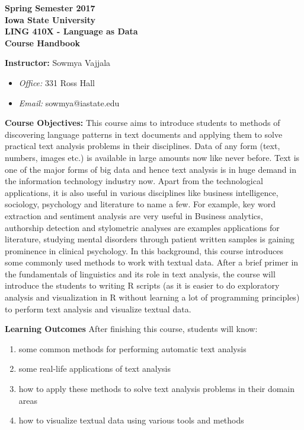 \documentclass[11pt,a4paper]{article}
\begin{document}
\begin{center}
  \textbf{Spring Semester 2017 \\ Iowa State University\\[3ex]
  {\Large LING 410X - Language as Data}\\[3ex]
  Course Handbook
}
\end{center}

\bigskip
\textbf{\large Instructor:}
  Sowmya Vajjala
  \begin{itemize}\vspace*{-.4\baselineskip}\itemsep-.4ex
  \item \textit{Office:} 331 Ross Hall
  \item \textit{Email:} sowmya@iastate.edu
\end{itemize}

\textbf{\large Course Objectives:}
This course aims to introduce students to methods of discovering language patterns in text documents and applying them to solve practical text analysis problems in their disciplines. Data of any form (text, numbers, images etc.) is available in large amounts now like never before. Text is one of the major forms of big data and hence text analysis is in huge demand in the information technology industry now. Apart from the technological applications, it is also useful in various disciplines like business intelligence, sociology, psychology and literature to name a few. For example, key word extraction and sentiment analysis are very useful in Business analytics, authorship detection and stylometric analyses are examples applications for literature, studying mental disorders through patient written samples is gaining prominence in clinical psychology. In this background, this course introduces some commonly used methods to work with textual data. After a brief primer in the fundamentals of linguistics and its role in text analysis, the course will introduce the students to writing  R scripts (as it is easier to do exploratory analysis and visualization in R without learning a lot of programming principles) to perform text analysis and visualize textual data. 

\bigskip\textbf{\large Learning Outcomes}
After finishing this course, students will know:
\begin{enumerate}
\item some common methods for performing automatic text analysis
\item some real-life applications of text analysis
\item how to apply these methods to solve text analysis problems in their domain areas
\item how to visualize textual data using various tools and methods
\end{enumerate}
\end{document}
